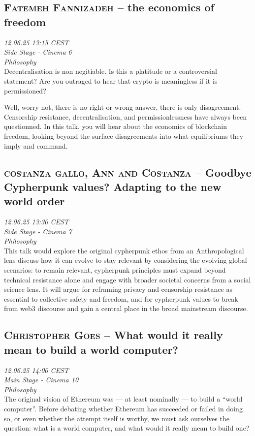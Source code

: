 \clearpage
\subsection {\textsc{Fatemeh Fannizadeh}  -- the economics of freedom} \noindent \textit {12.06.25 13:15 CEST\\ Side Stage - Cinema 6\\ Philosophy}\\[1em] Decentralisation is non negitiable. Is this a platitude or a controversial statement? Are you outraged to hear that crypto is meaningless if it is permissioned?

Well, worry not, there is no right or wrong answer, there is only disagreement. Censorship resistance, decentralisation, and permissionlessness have always been questionned. In this talk, you will hear about the economics of blockchain freedom, looking beyond the surface disagreements into what equilibriums they imply and command.

\clearpage
\subsection {\textsc{costanza gallo, Ann and Costanza}  -- Goodbye Cypherpunk values? Adapting to the new world order} \noindent \textit {12.06.25 13:30 CEST\\ Side Stage - Cinema 7\\ Philosophy}\\[1em] This talk would explore the original cypherpunk ethos from an Anthropological lens discuss how it can evolve to stay relevant by considering the evolving global scenarios: to remain relevant, cypherpunk principles must expand beyond technical resistance alone and engage with broader societal concerns from a social science lens. It will argue for reframing privacy and censorship resistance as essential to collective safety and freedom, and for cypherpunk values to break from web3 discourse and gain a central place in the broad mainstream discourse.

\clearpage
\subsection {\textsc{Christopher Goes}  -- What would it really mean to build a world computer?} \noindent \textit {12.06.25 14:00 CEST\\ Main Stage - Cinema 10\\ Philosophy}\\[1em] The original vision of Ethereum was — at least nominally — to build a ``world computer''. Before debating whether Ethereum has succeeded or failed in doing so, or even whether the attempt itself is worthy, we must ask ourselves the question: what is a world computer, and what would it really mean to build one?

